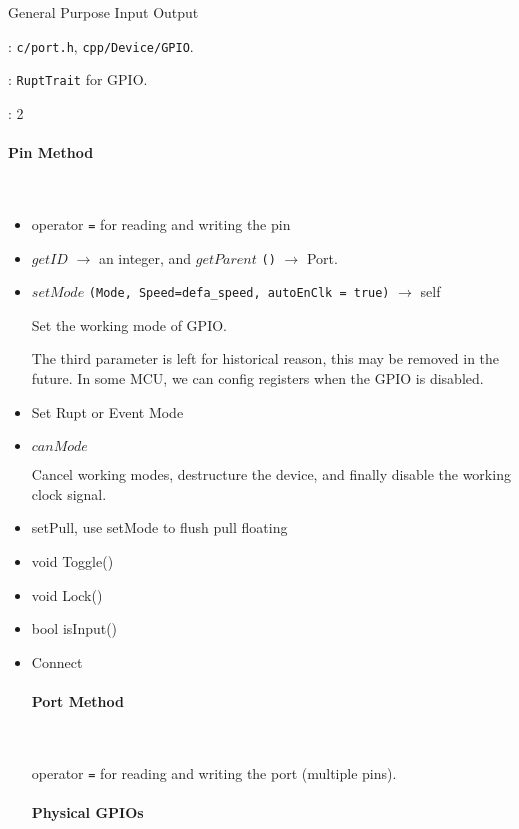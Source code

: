
General Purpose Input Output

: \verb`c/port.h`, \verb`cpp/Device/GPIO`.

: \verb`RuptTrait` for GPIO.

: 2

\paragraph{Pin Method} \

\begin{itemize}
\item operator \verb`=` for reading and writing the pin

\item $getID$ $\rightarrow$ an integer, and $getParent$ \verb`()` $\rightarrow$ {Port}.

\item $setMode$ \verb`(Mode, Speed=defa_speed, autoEnClk = true)` $\rightarrow$ self

Set the working mode of GPIO.

The third parameter is left for historical reason, this may be removed in the future. In some MCU, we can config registers when the GPIO is disabled. %

\item Set Rupt or Event Mode

\item $canMode$

Cancel working modes, destructure the device, and finally disable the working clock signal.

\item setPull, use setMode to flush pull floating

\item void Toggle()

\item void Lock()

\item bool isInput()

\item Connect %

\paragraph{Port Method} \

operator \verb`=` for reading and writing the port (multiple pins).

\paragraph{Physical GPIOs} \


\end{itemize}
